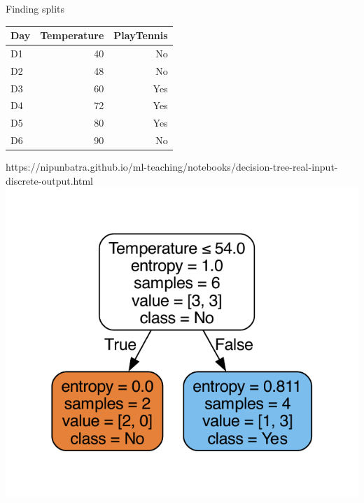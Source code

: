 \documentclass[usenames,dvipsnames]{beamer}
\begin{document}
    \begin{frame}{Finding splits}
        \begin{table}[]
            \begin{tabular}{@{}lrr@{}}
                \toprule
                \textbf{Day} & \textbf{Temperature} & \textbf{PlayTennis} \\ \midrule
                D1           & 40                   & No                  \\
                D2           & 48                   & No                  \\
                D3           & 60                   & Yes                 \\
                D4           & 72                   & Yes                 \\
                D5           & 80                   & Yes                 \\
                D6           & 90                   & No                  \\ \bottomrule
            \end{tabular}
        \end{table}
        \begin{notebookbox}{https://nipunbatra.github.io/ml-teaching/notebooks/decision-tree-real-input-discrete-output.html}
            \includegraphics[scale=0.3]{../assets/decision-trees/figures/real-ip-1.pdf}
        \end{notebookbox}
    \end{frame}
\end{document}
